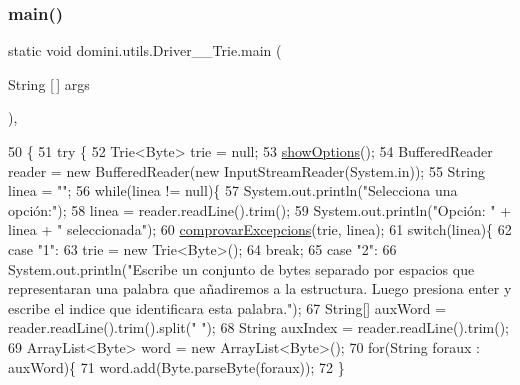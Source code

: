 \subsubsection{\texorpdfstring{main()}{main()}}
{\footnotesize\ttfamily static void domini.\+utils.\+Driver\+\_\+\+\_\+\+Trie.\+main (\begin{DoxyParamCaption}\item[{String \mbox{[}$\,$\mbox{]}}]{args }\end{DoxyParamCaption})\hspace{0.3cm}{\ttfamily [inline]}, {\ttfamily [static]}}


\begin{DoxyCode}
50                                            \{
51     \textcolor{keywordflow}{try} \{
52         Trie<Byte> trie = null;
53         \hyperlink{classdomini_1_1utils_1_1Driver____Trie_a8b61698744500c2c6ffa92f861162ff5}{showOptions}();
54         BufferedReader reader = \textcolor{keyword}{new} BufferedReader(\textcolor{keyword}{new} InputStreamReader(System.in));
55         String linea = \textcolor{stringliteral}{""};
56         \textcolor{keywordflow}{while}(linea != null)\{
57             System.out.println(\textcolor{stringliteral}{"Selecciona una opción:"});
58             linea = reader.readLine().trim();
59             System.out.println(\textcolor{stringliteral}{"Opción: "} + linea + \textcolor{stringliteral}{" seleccionada"});
60             \hyperlink{classdomini_1_1utils_1_1Driver____Trie_a6fd273250b3951144ce3a76f26330ab1}{comprovarExcepcions}(trie, linea);
61             \textcolor{keywordflow}{switch}(linea)\{
62                 \textcolor{keywordflow}{case} \textcolor{stringliteral}{"1"}:
63                     trie = \textcolor{keyword}{new} Trie<Byte>();
64                 \textcolor{keywordflow}{break};
65                 \textcolor{keywordflow}{case} \textcolor{stringliteral}{"2"}:
66                     System.out.println(\textcolor{stringliteral}{"Escribe un conjunto de bytes separado por espacios que
       representaran una palabra que añadiremos a la estructura. Luego presiona enter y escribe el indice que identificara esta
       palabra."});
67                     String[] auxWord = reader.readLine().trim().split(\textcolor{stringliteral}{" "});
68                     String auxIndex = reader.readLine().trim();
69                     ArrayList<Byte> word = \textcolor{keyword}{new} ArrayList<Byte>();
70                     \textcolor{keywordflow}{for}(String foraux : auxWord)\{
71                         word.add(Byte.parseByte(foraux));
72                     \}

\end{DoxyCode}
